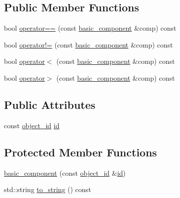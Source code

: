 \subsection*{Public Member Functions}
\begin{DoxyCompactItemize}
\item 
bool \hyperlink{classmlnet_1_1basic__component_a468c756c9a5d625b49e2aa1f93b4c6a3}{operator==} (const \hyperlink{classmlnet_1_1basic__component}{basic\+\_\+component} \&comp) const 
\item 
bool \hyperlink{classmlnet_1_1basic__component_a17bdf6e789f07905a80e7d4f869092a5}{operator!=} (const \hyperlink{classmlnet_1_1basic__component}{basic\+\_\+component} \&comp) const 
\item 
bool \hyperlink{classmlnet_1_1basic__component_a6b85dec9c0f8275d0d25725dc03d64b9}{operator$<$} (const \hyperlink{classmlnet_1_1basic__component}{basic\+\_\+component} \&comp) const 
\item 
bool \hyperlink{classmlnet_1_1basic__component_acf2881d46bd20988ea48668d2e8ba2ff}{operator$>$} (const \hyperlink{classmlnet_1_1basic__component}{basic\+\_\+component} \&comp) const 
\end{DoxyCompactItemize}
\subsection*{Public Attributes}
\begin{DoxyCompactItemize}
\item 
const \hyperlink{namespacemlnet_a318fc9bfdb74e1da4d44d0c50d4a453d}{object\+\_\+id} \hyperlink{classmlnet_1_1basic__component_a7d56ea959ef686405bc0fa4830b03347}{id}
\end{DoxyCompactItemize}
\subsection*{Protected Member Functions}
\begin{DoxyCompactItemize}
\item 
\hyperlink{classmlnet_1_1basic__component_a72cb97290d5c73c64f43b4ce9e0891cf}{basic\+\_\+component} (const \hyperlink{namespacemlnet_a318fc9bfdb74e1da4d44d0c50d4a453d}{object\+\_\+id} \&\hyperlink{classmlnet_1_1basic__component_a7d56ea959ef686405bc0fa4830b03347}{id})
\item 
std\+::string \hyperlink{classmlnet_1_1basic__component_a533b88a0d280b70800f71b406b45d6f3}{to\+\_\+string} () const 
\end{DoxyCompactItemize}


